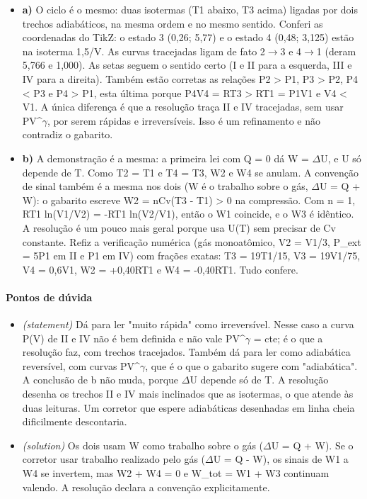 \documentclass{article}%
\begin{document}
\begin{itemize}%
\item%
\textbf{a)} O ciclo é o mesmo: duas isotermas (T1 abaixo, T3 acima) ligadas por dois trechos adiabáticos, na mesma ordem e no mesmo sentido. Conferi as coordenadas do TikZ: o estado 3 (0,26; 5,77) e o estado 4 (0,48; 3,125) estão na isoterma 1,5/V. As curvas tracejadas ligam de fato 2$\to$3 e 4$\to$1 (deram 5,766 e 1,000). As setas seguem o sentido certo (I e II para a esquerda, III e IV para a direita). Também estão corretas as relações P2 > P1, P3 > P2, P4 < P3 e P4 > P1, esta última porque P4V4 = RT3 > RT1 = P1V1 e V4 < V1. A única diferença é que a resolução traça II e IV tracejadas, sem usar PV\^{}$\gamma$, por serem rápidas e irreversíveis. Isso é um refinamento e não contradiz o gabarito.%
\item%
\textbf{b)} A demonstração é a mesma: a primeira lei com Q = 0 dá W = $\Delta$U, e U só depende de T. Como T2 = T1 e T4 = T3, W2 e W4 se anulam. A convenção de sinal também é a mesma nos dois (W é o trabalho sobre o gás, $\Delta$U = Q + W): o gabarito escreve W2 = nCv(T3 - T1) > 0 na compressão. Com n = 1, RT1 ln(V1/V2) = -RT1 ln(V2/V1), então o W1 coincide, e o W3 é idêntico. A resolução é um pouco mais geral porque usa U(T) sem precisar de Cv constante. Refiz a verificação numérica (gás monoatômico, V2 = V1/3, P\_ext = 5P1 em II e P1 em IV) com frações exatas: T3 = 19T1/15, V3 = 19V1/75, V4 = 0,6V1, W2 = +0,40RT1 e W4 = -0,40RT1. Tudo confere.%
\end{itemize}%
\paragraph{Pontos de dúvida}%
\begin{itemize}%
\item%
\textit{(statement)} Dá para ler "muito rápida" como irreversível. Nesse caso a curva P(V) de II e IV não é bem definida e não vale PV\^{}$\gamma$ = cte; é o que a resolução faz, com trechos tracejados. Também dá para ler como adiabática reversível, com curvas PV\^{}$\gamma$, que é o que o gabarito sugere com "adiabática". A conclusão de b não muda, porque $\Delta$U depende só de T. A resolução desenha os trechos II e IV mais inclinados que as isotermas, o que atende às duas leituras. Um corretor que espere adiabáticas desenhadas em linha cheia dificilmente descontaria.%
\item%
\textit{(solution)} Os dois usam W como trabalho sobre o gás ($\Delta$U = Q + W). Se o corretor usar trabalho realizado pelo gás ($\Delta$U = Q - W), os sinais de W1 a W4 se invertem, mas W2 + W4 = 0 e W\_tot = W1 + W3 continuam valendo. A resolução declara a convenção explicitamente.%
\end{itemize}%
\end{document}
